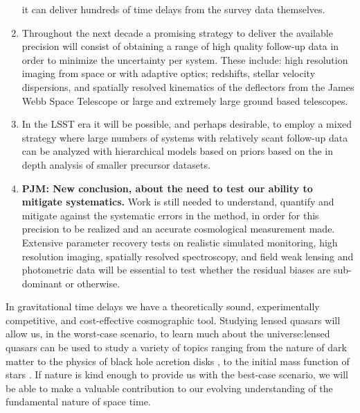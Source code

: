 \begin{enumerate}
it can deliver hundreds of time delays from the survey data themselves.
\item Throughout the next decade a promising strategy to deliver the
available precision will consist of obtaining a
range of high quality follow-up data in order to minimize the
uncertainty per system. These include: high resolution imaging from
space or with adaptive optics; redshifts, stellar velocity dispersions,
and spatially resolved kinematics of the deflectors from the James Webb
Space Telescope or large and extremely large ground based telescopes.
\item  In the LSST era it will be possible, and perhaps desirable,  to
employ a mixed strategy where large numbers of systems with relatively
scant follow-up data can be analyzed with hierarchical models based on
priors based on the in depth analysis of smaller precursor datasets.
\item {\bf PJM: New conclusion, about the need to test our ability to
mitigate systematics.} Work is still needed to understand, quantify and
mitigate against the systematic errors in  the method, in order for this
precision to be realized and an accurate cosmological measurement made.
Extensive parameter recovery tests on realistic simulated monitoring,
high resolution imaging, spatially resolved spectroscopy, and field weak
lensing and photometric data will be essential to test whether the
residual biases are sub-dominant or otherwise.
\end{enumerate}


%
%
In gravitational time delays we have a theoretically sound,
experimentally competitive, and cost-effective cosmographic tool.
%
Studying lensed
quasars will allow us, in the worst-case scenario, to learn much about
the universe:lensed quasars can be used to study a variety of topics
ranging from the nature of dark matter
\citep{Metcalf:2005p1203,Xu++09,Veg++14,Nie++14} to the physics of
black hole acretion disks \citep{PMK08,Blackburne:2010p6600}, to the
initial mass function of stars \citep{Sch++15}. If nature is kind
enough to provide us with the best-case scenario, we will be able to
make a valuable contribution to our evolving understanding of the
fundamental nature of space time.
